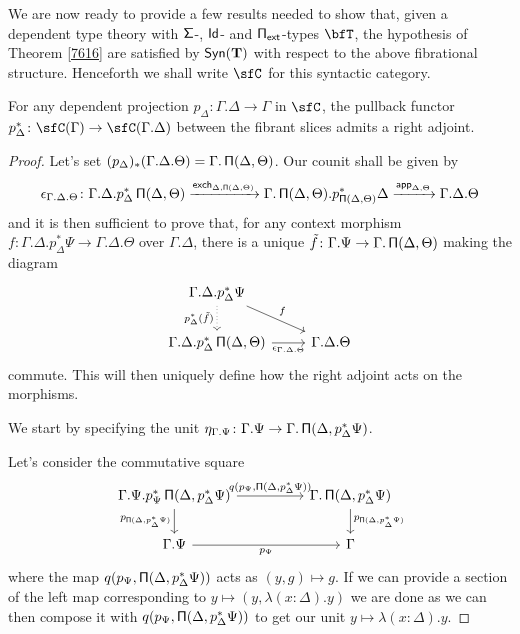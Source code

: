 We are now ready to provide a few results needed to show that, given a dependent
type theory with $\operatorname{\mathsf{\Sigma}}$-, $\operatorname{\mathsf{Id}}$- and $\operatorname{\mathsf{\Pi_{ext}}}$-types $\bfT$, the hypothesis of
Theorem \ref{7616} are satisfied by $\mathsf{Syn}(\mathbf{T})$ with respect to the above
fibrational structure. Henceforth we shall write $\sfC$ for this syntactic
category.

\begin{lem}\label{radj}
  For any dependent projection $p_\Delta\colon\Gamma.\Delta\rightarrow\Gamma$ in
  $\sfC$, the pullback functor
  $p_\Delta^*\colon\sfC(\Gamma)\rightarrow\sfC(\Gamma.\Delta)$ between the
  fibrant slices admits a right adjoint.
\end{lem}
\begin{proof}
  Let's set $(p_\Delta)_*(\Gamma.\Delta.\Theta)=\Gamma.\operatorname{\mathsf{\Pi}}(\Delta,\Theta)$. Our
  counit shall be given by
  \[\epsilon_{\Gamma.\Delta.\Theta}\colon\Gamma.\Delta.p^*_\Delta\operatorname{\mathsf{\Pi}}(\Delta,\Theta)
  \xrightarrow{\operatorname{\mathsf{exch}}_{\Delta,\operatorname{\mathsf{\Pi}}(\Delta,\Theta)}}\Gamma.\operatorname{\mathsf{\Pi}}(\Delta,\Theta).p^*_{\operatorname{\mathsf{\Pi}}(\Delta,\Theta)}\Delta
  \xrightarrow{\operatorname{\mathsf{app}}_{\Delta,\Theta}}\Gamma.\Delta.\Theta\]
  and it is then sufficient to prove that, for any context morphism
  $f\colon\Gamma.\Delta.p^*_\Delta\Psi\rightarrow\Gamma.\Delta.\Theta$ over
  $\Gamma.\Delta$, there is
  a unique $\tilde{f}\colon\Gamma.\Psi\rightarrow\Gamma.\operatorname{\mathsf{\Pi}}(\Delta,\Theta)$
  making the diagram
  \[\begin{tikzcd}
    {\Gamma.\Delta.p^*_\Delta\Psi} \\
    {\Gamma.\Delta.p^*_\Delta\Pis(\Delta,\Theta)} & {\Gamma.\Delta.\Theta}
    \arrow["f", from=1-1, to=2-2]
    \arrow["{\epsilon_{\Gamma.\Delta.\Theta}}"', from=2-1, to=2-2]
    \arrow["{p^*_\Delta(\tilde{f})}"', dotted, from=1-1, to=2-1]
  \end{tikzcd}\]
  commute. This will then uniquely define how the right adjoint acts on the
  morphisms.

  We start by specifying the unit
  $\eta_{\Gamma.\Psi}\colon\Gamma.\Psi\rightarrow\Gamma.\operatorname{\mathsf{\Pi}}(\Delta,p^*_{\Delta}\Psi)$.

  Let's consider the commutative square
  \[\begin{tikzcd}[column sep=huge]
    {\Gamma.\Psi.p^*_\Psi\Pis(\Delta,p^*_\Delta\Psi)} & {\Gamma.\Pis(\Delta,p^*_\Delta\Psi)} \\
    {\Gamma.\Psi} & \Gamma
    \arrow["{p_{\Pis(\Delta,p^*_\Delta\Psi)}}"', from=1-1, to=2-1]
    \arrow["{p_{\Psi}}"', from=2-1, to=2-2]
    \arrow["{p_{\Pis(\Delta,p^*_\Delta\Psi)}}", from=1-2, to=2-2]
    \arrow["{q(p_\Psi,\Pis(\Delta,p^*_\Delta\Psi))}", from=1-1, to=1-2]
  \end{tikzcd}\]
  where the map $q(p_\Psi,\operatorname{\mathsf{\Pi}}(\Delta,p^*_\Delta\Psi))$ acts as $(y,g)\mapsto
  g$. If we can provide a section of the left map
  corresponding to $y\mapsto(y,\lambda(x:\Delta).y)$ we are
  done as we can then compose
  it with $q(p_\Psi,\operatorname{\mathsf{\Pi}}(\Delta,p^*_\Delta\Psi))$ to get our unit
  $y\mapsto\lambda(x:\Delta).y$.


\end{proof}

